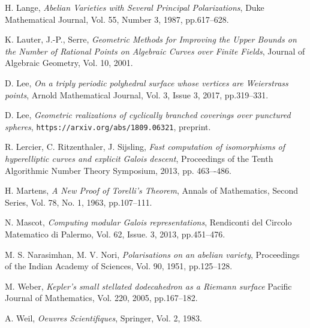 \documentclass[12pt,reqno]{amsart}
\theoremstyle{definition}
\theoremstyle{remark}
\begin{document}
\begin{thebibliography}{20}
H. Lange,
\textit{Abelian Varieties with Several Principal Polarizations},
Duke Mathematical Journal,
Vol. 55, Number 3, 1987, pp.617--628.


K. Lauter, J.-P., Serre, 
\textit{Geometric Methods for Improving the Upper Bounds on the Number of Rational Points on Algebraic Curves over Finite Fields}, 
Journal of Algebraic Geometry,
Vol. 10, 2001.

D. Lee,
\textit{On a triply periodic polyhedral surface whose vertices are Weierstrass points},
Arnold Mathematical Journal, 
Vol. 3, Issue 3, 2017, pp.319--331.

D. Lee, 
\textit{Geometric realizations of cyclically branched coverings over punctured spheres},
\texttt{https://arxiv.org/abs/1809.06321}, preprint.

R. Lercier, C. Ritzenthaler, J. Sijsling,
\textit{Fast computation of isomorphisms of hyperelliptic curves and explicit Galois descent},
Proceedings of the Tenth Algorithmic Number Theory Symposium, 2013, pp. 463–-486.

H. Martens,
\textit{A New Proof of Torelli's Theorem},
Annals of Mathematics,
Second Series, Vol. 78, No. 1, 1963, pp.107--111.

N. Mascot,
\textit{Computing modular Galois representations},
Rendiconti del Circolo Matematico di Palermo,
Vol. 62, Issue. 3, 2013, pp.451--476.

M. S. Narasimhan, M. V. Nori,
\textit{Polarisations on an abelian variety},
Proceedings of the Indian Academy of Sciences,
Vol. 90, 1951, pp.125--128.


M. Weber,
\textit{Kepler's small stellated dodecahedron as a Riemann surface}
Pacific Journal of Mathematics, 
Vol. 220, 2005, pp.167--182.


A. Weil,
\textit{Oeuvres Scientifiques},
Springer,
Vol. 2, 1983.











 

\end{thebibliography}



\end{document}
